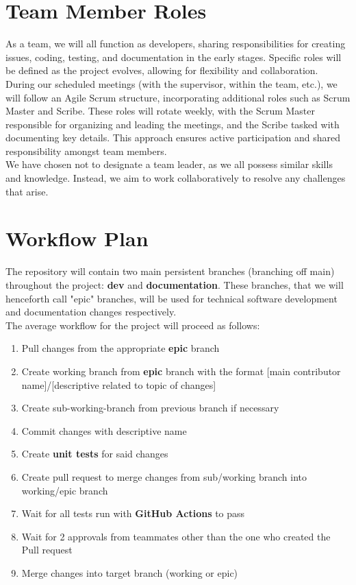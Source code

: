 \documentclass{article}
\begin{document}
\section{Team Member Roles}

\hspace{\parindent}As a team, we will all function as developers, sharing responsibilities
for creating issues, coding, testing, and documentation in the early stages. Specific roles
will be defined as the project evolves, allowing for flexibility and collaboration. \\

During our scheduled meetings (with the supervisor, within the team, etc.), we will follow
an Agile Scrum structure, incorporating additional roles such as Scrum Master and Scribe.
These roles will rotate weekly, with the Scrum Master responsible for organizing and leading
the meetings, and the Scribe tasked with documenting key details. This approach ensures active
participation and shared responsibility amongst team members. \\

We have chosen not to designate a team leader, as we all possess similar skills and knowledge.
Instead, we aim to work collaboratively to resolve any challenges that arise.

\section{Workflow Plan}

\hspace{\parindent}The repository will contain two main persistent branches (branching off main) throughout the project:
\textbf{dev} and \textbf{documentation}. These branches, that we will henceforth call "epic" branches, will be used for technical
software development and documentation changes respectively. \\

The average workflow for the project will proceed as follows:
\begin{enumerate}
  \item Pull changes from the appropriate \textbf{epic} branch
  \item Create working branch from \textbf{epic} branch with the format [main contributor name]/[descriptive related to topic of changes]
  \item Create sub-working-branch from previous branch if necessary
  \item Commit changes with descriptive name
  \item Create \textbf{unit tests} for said changes
  \item Create pull request to merge changes from sub/working branch into working/epic branch
  \item Wait for all tests run with \textbf{GitHub Actions} to pass
  \item Wait for 2 approvals from teammates other than the one who created the Pull request
  \item Merge changes into target branch (working or epic)
\end{enumerate}
\end{document}
